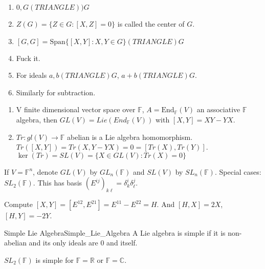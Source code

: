     \begin{example}
        \begin{enumerate}
            \item $0,G(TRIANGLE))G$
            \item $Z(G)=\{Z\in{G}:[X,Z]=0\}$ is called the center of $G$.
            \item $[G,G]=\textrm{Span}\{[X,Y]:X,Y\in{G}\}(TRIANGLE)G$
            \item Fuck it.
            \item For ideals $a,b(TRIANGLE)G$, $a+b(TRIANGLE)G$.
            \item Similarly for subtraction.
        \end{enumerate}
    \end{example}
    \begin{example}
        \begin{enumerate}
            \item V finite dimensional vector space over $\mathbb{F}$,
                  $A=\textrm{End}_{\mathbb{F}}(V)$ an associative
                  $\mathbb{F}$ algebra, then
                  $GL(V)=Lie(End_{\mathbb{F}}(V))$
                  with $[X,Y]=XY-YX$.
            \item $Tr:gl(V)\rightarrow\mathbb{F}$ abelian is a Lie algebra
                  homomorphism. $Tr([X,Y])=Tr(X,Y-YX)=0=[Tr(X),Tr(Y)]$.
                  $\ker(Tr)=SL(V)=\{X\in{GL}(V):Tr(X)=0\}$
        \end{enumerate}
    \end{example}
    If $V=\mathbb{F}^{n}$, denote $GL(V)$ by $GL_{n}(\mathbb{F})$ and $SL(V)$
    by $SL_{n}(\mathbb{F})$. Special cases: $SL_{2}(\mathbb{F})$. This has basis
    $(E^{ij})_{k\ell}=\delta^{i}_{k}\delta^{j}_{\ell}$.
    \begin{example}
        Compute $[X,Y]=[E^{12},E^{21}]=E^{11}-E^{22}=H$.
        And $[H,X]=2X$, $[H,Y]=\minus{2}Y$.
    \end{example}
    \begin{ldefinition}{Simple Lie Algebra}{Simple_Lie_Algebra}
        A Lie algebra is simple if it is non-abelian and its only ideals are
        $0$ and itself.
    \end{ldefinition}
    \begin{theorem}
        $SL_{2}(\mathbb{F})$ is simple for $\mathbb{F}=\mathbb{R}$ or
        $\mathbb{F}=\mathbb{C}$.
    \end{theorem}
